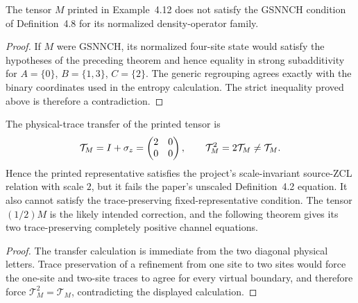 \begin{lemma}
    \label{thm:cpsv_example412_not_gsnnch}
    \leanok
    The tensor $M$ printed in Example~4.12 does not satisfy the GSNNCH
    condition of Definition~4.8 for its normalized density-operator family.
\end{lemma}
\begin{proof}\leanok
    If $M$ were GSNNCH, its normalized four-site state would satisfy the
    hypotheses of the preceding theorem and hence equality in strong
    subadditivity for $A=\{0\}$, $B=\{1,3\}$, $C=\{2\}$. The generic
    regrouping agrees exactly with the binary coordinates used in the entropy
    calculation. The strict inequality proved above is therefore a
    contradiction.
\end{proof}

\begin{lemma}
    \label{thm:cpsv_example412_literal_zcl_rfp_gap}
    \leanok
    The physical-trace transfer of the printed tensor is
    \begin{align}
        \mathcal T_M=I+\sigma_z
        =\begin{pmatrix}2&0\\0&0\end{pmatrix},
        \qquad
        \mathcal T_M^2=2\mathcal T_M\ne\mathcal T_M.
        \notag
    \end{align}
    Hence the printed representative satisfies the project's scale-invariant
    source-ZCL relation with scale $2$, but it fails the paper's unscaled
    Definition~4.2 equation. It also cannot satisfy the trace-preserving
    fixed-representative condition. The tensor $(1/2)M$ is the likely intended
    correction, and the following theorem gives its two trace-preserving
    completely positive channel equations.
\end{lemma}
\begin{proof}\leanok
    The transfer calculation is immediate from the two diagonal physical
    letters.  Trace preservation of a refinement from one site to two sites
    would force the one-site and two-site traces to agree for every virtual
    boundary, and therefore force $\mathcal T_M^2=\mathcal T_M$, contradicting
    the displayed calculation.
\end{proof}

